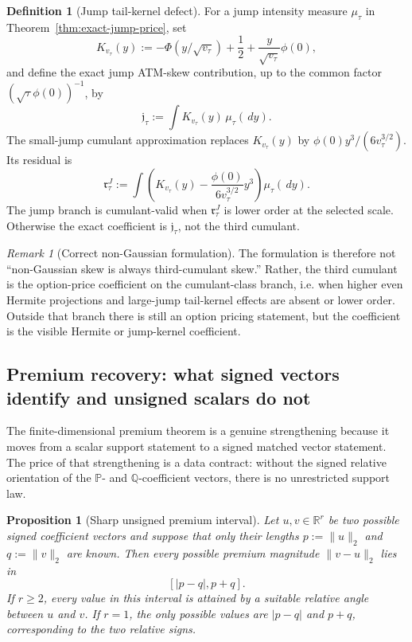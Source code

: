 \documentclass[11pt,a4paper]{amsart}
\theoremstyle{plain}
\newtheorem{proposition}[theorem]{Proposition}
\theoremstyle{definition}
\newtheorem{definition}[theorem]{Definition}
\theoremstyle{remark}
\newtheorem{remark}[theorem]{Remark}
\newcommand{\R}{\mathbb{R}}
\newcommand{\PP}{\mathbb{P}}
\newcommand{\QQ}{\mathbb{Q}}
\newcommand{\dd}{\,d}
\begin{document}
\begin{definition}[Jump tail-kernel defect]
\label{def:jump-tail-kernel-defect}
For a jump intensity measure \(\mu_\tau\) in Theorem~\ref{thm:exact-jump-price}, set
\[
        K_{v_\tau}(y)
        :=
        -\Phi(y/\sqrt{v_\tau})+\frac12+\frac{y}{\sqrt{v_\tau}}\phi(0),
\]
and define the exact jump ATM-skew contribution, up to the common factor
\((\sqrt\tau\phi(0))^{-1}\), by
\[
        \mathfrak j_\tau
        :=
        \int K_{v_\tau}(y)\,\mu_\tau(\dd y).
\]
The small-jump cumulant approximation replaces \(K_{v_\tau}(y)\) by
\(\phi(0)y^3/(6v_\tau^{3/2})\).  Its residual is
\[
        \mathfrak r_\tau^J
        :=
        \int
        \left(
                K_{v_\tau}(y)-\frac{\phi(0)}{6v_\tau^{3/2}}y^3
        \right)
        \mu_\tau(\dd y).
\]
The jump branch is cumulant-valid when \(\mathfrak r_\tau^J\) is lower order at
the selected scale.  Otherwise the exact coefficient is \(\mathfrak j_\tau\), not the third
cumulant.
\end{definition}

\begin{remark}[Correct non-Gaussian formulation]
\label{rem:correct-ng-headline}
The formulation is therefore not ``non-Gaussian skew is always third-cumulant skew.''  Rather,
the third cumulant is the option-price coefficient on the cumulant-class branch, i.e.
when higher even Hermite projections and large-jump tail-kernel effects are absent or lower order.
Outside that branch there is still an option pricing statement, but the coefficient is the
visible Hermite or jump-kernel coefficient.
\end{remark}

\subsection{Premium recovery: what signed vectors identify and unsigned scalars do not}
\label{subsec:premium-recovery-scope}

The finite-dimensional premium theorem is a genuine strengthening because it moves from a scalar
support statement to a signed matched vector statement.  The price of that strengthening is a data
contract: without the signed relative orientation of the \(\PP\)- and \(\QQ\)-coefficient vectors,
there is no unrestricted support law.

\begin{proposition}[Sharp unsigned premium interval]
\label{prop:unsigned-premium-interval}
Let \(u,v\in\R^r\) be two possible signed coefficient vectors and suppose that only their lengths
\(p:=\|u\|_2\) and \(q:=\|v\|_2\) are known.  Then every possible premium magnitude
\(\|v-u\|_2\) lies in
\[
        [|p-q|,p+q].
\]
If \(r\ge2\), every value in this interval is attained by a suitable relative angle between \(u\)
and \(v\).  If \(r=1\), the only possible values are \(|p-q|\) and \(p+q\), corresponding to the
two relative signs.
\end{proposition}
\end{document}
